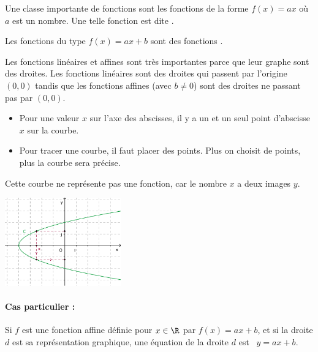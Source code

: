 \begin{definition}
    Une classe importante de fonctions sont les fonctions de la forme \( f(x)=ax\) où \( a\) est un nombre. Une telle fonction est dite . 

    Les fonctions du type \( f(x)=ax+b\) sont des fonctions . 
\end{definition}
Les fonctions linéaires et affines sont très importantes parce que leur graphe sont des droites. Les fonctions linéaires sont des droites qui passent par l'origine \( (0,0)\) tandis que les fonctions affines (avec \( b\neq 0\)) sont des droites ne passant pas par \( (0,0)\).


\begin{itemize}
\item
    Pour une valeur $x$ sur l'axe des abscisses, il y a un et un seul point d'abscisse $x$ sur la courbe.
\item
    Pour tracer une courbe, il faut placer des points. Plus on choisit de points, plus la courbe sera précise.
\end{itemize}

\begin{rem}
  \begin{minipage}[t]{0.45\linewidth}
    Cette courbe ne représente pas une fonction, car le nombre $x$ a
    deux images $y$.    
  \end{minipage}
  \qquad
  \begin{minipage}[c]{0.4\linewidth}
    \includegraphics[width=5cm]{F_NonFct.pdf}
  \end{minipage}
\end{rem}


\paragraph{Cas particulier :} 
\begin{minipage}[t]{0.8\linewidth}
  Si $f$ est une fonction affine définie pour $x\in\R$ par 
  $f(x)=ax+b$, et si la droite $d$ est sa représentation graphique,
  une équation de la droite $d$ est \ $y=ax+b$.
\end{minipage}

